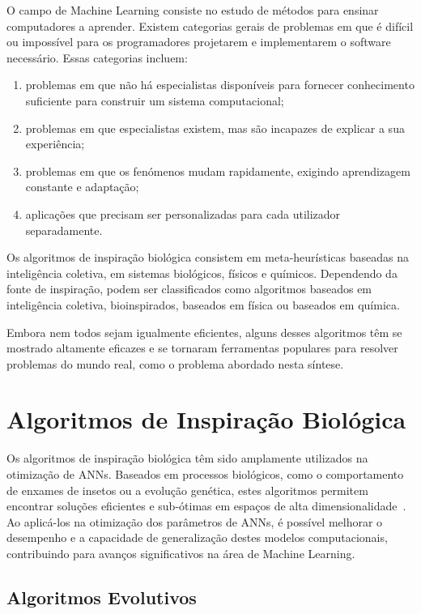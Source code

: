 \documentclass[conference]{IEEEtran}
\begin{document}
O campo de Machine Learning consiste no estudo de métodos para ensinar computadores a aprender. Existem categorias gerais de problemas em que é difícil ou impossível para os programadores projetarem e implementarem o software necessário. Essas categorias incluem:
\begin{enumerate}
    \item problemas em que não há especialistas disponíveis para fornecer conhecimento suficiente para construir um sistema computacional;
    \item problemas em que especialistas existem, mas são incapazes de explicar a sua experiência;
    \item problemas em que os fenómenos mudam rapidamente, exigindo aprendizagem constante e adaptação;
    \item aplicações que precisam ser personalizadas para cada utilizador separadamente.~\cite{Mitchell1996}
\end{enumerate}

Os algoritmos de inspiração biológica consistem em meta-heurísticas baseadas na inteligência coletiva, em sistemas biológicos, físicos e químicos. Dependendo da fonte de inspiração, podem ser classificados como algoritmos baseados em inteligência coletiva, bioinspirados, baseados em física ou baseados em química.~\cite{Fister2013AOptimization}

Embora nem todos sejam igualmente eficientes, alguns desses algoritmos têm se mostrado altamente eficazes e se tornaram ferramentas populares para resolver problemas do mundo real, como o problema abordado nesta síntese.

\section{Algoritmos de Inspiração Biológica}

Os algoritmos de inspiração biológica têm sido amplamente utilizados na otimização de ANNs. Baseados em processos biológicos, como o comportamento de enxames de insetos ou a evolução genética, estes algoritmos permitem encontrar soluções eficientes e sub-ótimas em espaços de alta dimensionalidade~\cite{Fister2013AOptimization}. Ao aplicá-los na otimização dos parâmetros de ANNs, é possível melhorar o desempenho e a capacidade de generalização destes modelos computacionais, contribuindo para avanços significativos na área de Machine Learning.

\subsection{Algoritmos Evolutivos}
\end{document}
